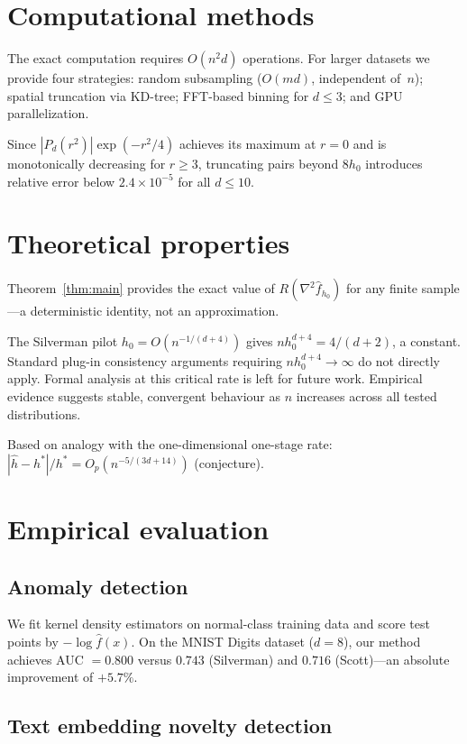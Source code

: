 \documentclass[numsec,webpdf,modern,medium,namedate]{oup-authoring-template}
\theoremstyle{thmstyleone}
\theoremstyle{thmstyletwo}
\theoremstyle{thmstylethree}
\begin{document}
\section{Computational methods}\label{sec:computation}

The exact computation requires $O(n^2 d)$ operations. For larger datasets we provide four strategies: random subsampling ($O(md)$, independent of~$n$); spatial truncation via KD-tree; FFT-based binning for $d \leq 3$; and GPU parallelization.

Since $|P_d(r^2)|\exp(-r^2/4)$ achieves its maximum at $r=0$ and is monotonically decreasing for $r \geq 3$, truncating pairs beyond $8h_0$ introduces relative error below $2.4 \times 10^{-5}$ for all $d \leq 10$.


\section{Theoretical properties}\label{sec:theory}

Theorem~\ref{thm:main} provides the exact value of $R(\nabla^2\hat{f}_{h_0})$ for any finite sample---a deterministic identity, not an approximation.

The Silverman pilot $h_0 = O(n^{-1/(d+4)})$ gives $nh_0^{d+4} = 4/(d+2)$, a constant. Standard plug-in consistency arguments requiring $nh_0^{d+4} \to \infty$ do not directly apply. Formal analysis at this critical rate is left for future work. Empirical evidence suggests stable, convergent behaviour as $n$ increases across all tested distributions.

Based on analogy with the one-dimensional one-stage rate: $|\hat{h} - h^*|/h^* = O_p(n^{-5/(3d+14)})$ (conjecture).


\section{Empirical evaluation}\label{sec:experiments}

\subsection{Anomaly detection}

We fit kernel density estimators on normal-class training data and score test points by $-\log\hat{f}(x)$. On the MNIST Digits dataset ($d=8$), our method achieves AUC $= 0.800$ versus $0.743$ (Silverman) and $0.716$ (Scott)---an absolute improvement of $+5.7\%$.

\subsection{Text embedding novelty detection}
\end{document}
